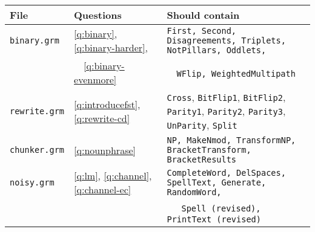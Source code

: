 \documentclass[11pt]{article}
\begin{document}
\medskip
\begin{adjustbox}{max width=\linewidth}
	\begin{tabular}{l|l|l}
	\textbf{File} & \textbf{Questions} & \textbf{Should contain} \\\hline\hline
	\texttt{binary.grm} & \ref{q:binary}, \ref{q:binary-harder}, & \texttt{First, Second, Disagreements, Triplets, NotPillars, Oddlets,} \\
	                    & \ \ \ref{q:binary-evenmore} & \ \ \texttt{WFlip, WeightedMultipath} \\
	\texttt{rewrite.grm} & \ref{q:introducefst}, \ref{q:rewrite-cd} & \texttt{Cross}, \texttt{BitFlip1}, \texttt{BitFlip2}, \texttt{Parity1}, \texttt{Parity2}, \texttt{Parity3}, \texttt{UnParity}, \texttt{Split} \\
	\texttt{chunker.grm} & \ref{q:nounphrase} & \texttt{NP, MakeNmod, TransformNP, BracketTransform, BracketResults}\\

	\texttt{noisy.grm} & \ref{q:lm}, \ref{q:channel}, \ref{q:channel-ec} & \texttt{CompleteWord, DelSpaces, SpellText, Generate, RandomWord,}  \\
                         & & \ \ \ \texttt{Spell \textnormal{(revised)}, PrintText \textnormal{(revised)}} 
	\end{tabular}
\end{adjustbox}
\medskip
\end{document}
